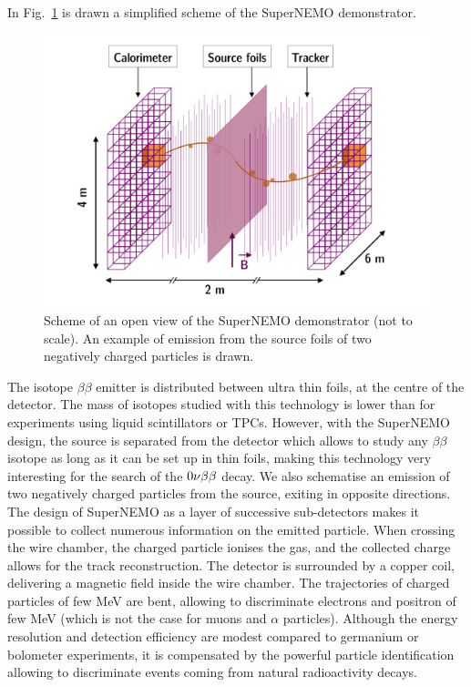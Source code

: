 In Fig.~\ref{fig:demonstrator_scheme} is drawn a simplified scheme of the SuperNEMO demonstrator.
\begin{figure}[h!]
\centering
\includegraphics[width=1\textwidth]{SNdemonstrator/fig_SNdemonstrator/demonstrator_sheme.pdf}
\caption{Scheme of an open view of the SuperNEMO demonstrator (not to scale).
An example of emission from the source foils of two negatively charged particles is drawn.
\label{fig:demonstrator_scheme}}
\end{figure}
The isotope $\beta\beta$ emitter is distributed between ultra thin foils, at the centre of the detector.
The mass of isotopes studied with this technology is lower than for experiments using liquid scintillators or TPCs.
However, with the SuperNEMO design, the source is separated from the detector which allows to study any $\beta\beta$ isotope as long as it can be set up in thin foils, making this technology very interesting for the search of the $0\nu\beta\beta$ decay.
We also schematise an emission of two negatively charged particles from the source, exiting in opposite directions.
The design of SuperNEMO as a layer of successive sub-detectors makes it possible to collect numerous information on the emitted particle.
When crossing the wire chamber, the charged particle ionises the gas, and the collected charge allows for the track reconstruction.
The detector is surrounded by a copper coil, delivering a magnetic field inside the wire chamber.
The trajectories of charged particles of few MeV are bent, allowing to discriminate electrons and positron of few MeV (which is not the case for muons and $\alpha$ particles).
Although the energy resolution and detection efficiency are modest compared to germanium or bolometer experiments, it is compensated by the powerful particle identification allowing to discriminate events coming from natural radioactivity decays.
